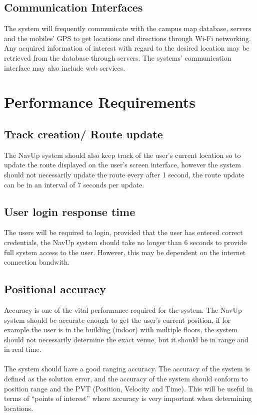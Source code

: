 \documentclass[a4paper, 12pt]{article}
\begin{document}
	\subsection{Communication Interfaces}
The system will frequently communicate with the campus map database, servers and the mobiles’ GPS to get locations and directions through Wi-Fi networking. Any acquired information of interest with regard to the desired location may be retrieved from the database through servers. The systems’ communication interface may also include web services.

\section{Performance Requirements}
	\subsection{Track creation/ Route update}
	The NavUp system should also keep track of the user's current location
	so to update the route displayed on the user's screen interface, however 
	the system should not necessarily update the route every after 1 second, the 
	route update can be in an interval of 7 seconds per update.
	\subsection{User login response time}
	The users will be required to login, provided that the user has
	entered correct credentials, the NavUp system should take no longer
	than 6 seconds to provide full system access to the user. However, this
	may be dependent on the internet connection bandwith.
	\subsection{Positional accuracy}
	Accuracy is one of the vital performance required for the system. The NavUp 
	system should be accurate enough to get the user’s current position, if for 
	example the user is in the building (indoor) with multiple floors, the system 
	should not necessarily determine the exact venue, but it should be in range and 
	in real time.\\\\ The system should have a good ranging accuracy. The accuracy of the 
	system is defined as the solution error, and the accuracy of the system should conform 
	to position range and the PVT (Position, Velocity and Time). This will be useful in 
	terms of “points of interest” where accuracy is very important when determining locations.
\end{document}
